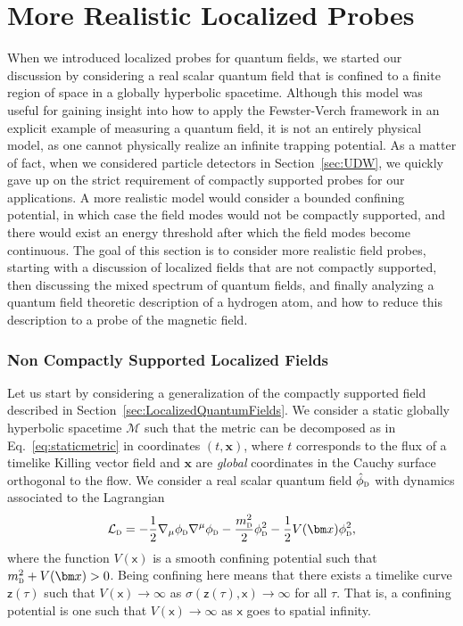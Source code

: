 \documentclass[letterpaper,12pt,titlepage,oneside,final]{book}
\newcommand{\M}{\mathcal{M}}
\newcommand{\mf}{\mathsf}%
\newcommand{\tc}[1]{\textsc{#1}}
\begin{document}
\section{More Realistic Localized Probes}\label{sec:MoreRealisticProbes}


When we introduced localized probes for quantum fields, we started our discussion by considering a real scalar quantum field that is confined to a finite region of space in a globally hyperbolic spacetime. Although this model was useful for gaining insight into how to apply the Fewster-Verch framework in an explicit example of measuring a quantum field, it is not an entirely physical model, as one cannot physically realize an infinite trapping potential. As a matter of fact, when we considered particle detectors in Section~\ref{sec:UDW}, we quickly gave up on the strict requirement of compactly supported probes for our applications. A more realistic model would consider a bounded confining potential, in which case the field modes would not be compactly supported, and there would exist an energy threshold after which the field modes become continuous. The goal of this section is to consider more realistic field probes, starting with a discussion of localized fields that are not compactly supported, then discussing the mixed spectrum of quantum fields, and finally analyzing a quantum field theoretic description of a hydrogen atom, and how to reduce this description to a probe of the magnetic field.


\subsubsection*{Non Compactly Supported Localized Fields}

Let us start by considering a generalization of the compactly supported field described in Section~\ref{sec:LocalizedQuantumFields}. We consider a static globally hyperbolic spacetime $\M$ such that the metric can be decomposed as in Eq.~\eqref{eq:staticmetric} in coordinates $(t,\bm x)$, where $t$ corresponds to the flux of a timelike Killing vector field and $\bm x$ are \textit{global} coordinates in the Cauchy surface orthogonal to the flow. We consider a real scalar quantum field $\hat{\phi}_\tc{d}$ with dynamics associated to the Lagrangian
\begin{equation}
    \mathcal{L}_\tc{d} = - \frac{1}{2}\nabla_\mu \phi_\tc{d}\nabla^\mu \phi_\tc{d} - \frac{m_\tc{d}^2}{2}\phi_\tc{d}^2 - \frac{1}{2}V(\bm x)\phi_\tc{d}^2,
\end{equation}
where the function $V(\mf x)$ is a smooth confining potential such that $m_\tc{d}^2 + V(\bm x)>0$. Being confining here means that there exists a timelike curve $\mf z(\tau)$ such that $V(\mf x) \to \infty$ as $\sigma(\mf z(\tau),\mf x)\to \infty$ for all $\tau$. That is, a confining potential is one such that $V(\mf x)\to \infty$ as $\mf x$ goes to spatial infinity. 
\end{document}
